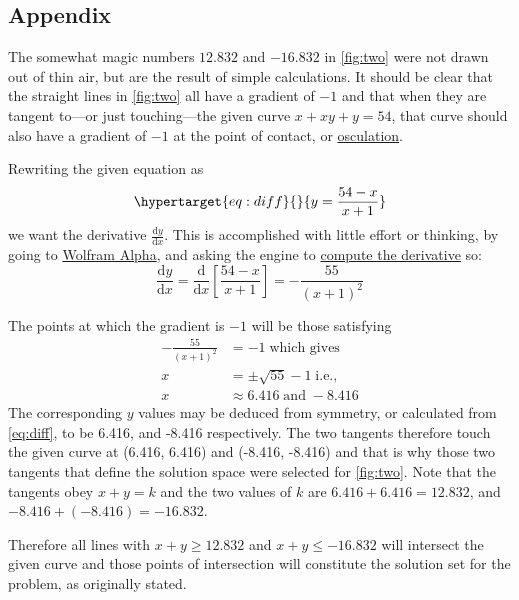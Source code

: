 \documentclass[
  a4paper,
]{article}
\begin{document}
\hypertarget{appendix}{%
\subsection{Appendix}\label{appendix}}

The somewhat magic numbers \(12.832\) and \(-16.832\) in \cref{fig:two}
were not drawn out of thin air, but are the result of simple
calculations. It should be clear that the straight lines in
\cref{fig:two} all have a gradient of \(-1\) and that when they are
tangent to---or just touching---the given curve \(x + xy + y = 54\),
that curve should also have a gradient of \(-1\) at the point of
contact, or
\href{https://en.wikipedia.org/wiki/Osculating_curve}{osculation}.

Rewriting the given equation as
\begin{equation}\protect\hypertarget{eq:diff}{}{
y = \frac{54-x}{x+1}
}\label{eq:diff}\end{equation} we want the derivative
\(\frac{\mathrm{d}y}{\mathrm{d}x}\). This is accomplished with little
effort or thinking, by going to
\href{https://www.wolframalpha.com}{Wolfram Alpha}, and asking the
engine to
\href{https://www.wolframalpha.com/calculators/derivative-calculator/}{compute
the derivative} so: \[
\frac{\mathrm{d}y}{\mathrm{d}x} = \frac{\mathrm{d}}{\mathrm{d}x}\left[\frac{54 - x}{x + 1}\right] = -\frac{55}{(x + 1)^2}
\]

The points at which the gradient is \(-1\) will be those satisfying \[
\begin{aligned}
-\frac{55}{(x+1)^2} &= -1 \; \mbox{which gives}\\
x &= \pm\sqrt{55} - 1 \; \mbox{i.e.,}\\
x &\approx 6.416 \;\mbox{and}\; -8.416
\end{aligned}
\] The corresponding \(y\) values may be deduced from symmetry, or
calculated from \cref{eq:diff}, to be 6.416, and -8.416 respectively.
The two tangents therefore touch the given curve at (6.416, 6.416) and
(-8.416, -8.416) and that is why those two tangents that define the
solution space were selected for \cref{fig:two}. Note that the tangents
obey \(x + y = k\) and the two values of \(k\) are
\(6.416 + 6.416 = 12.832\), and \(-8.416 + (-8.416) = -16.832\).

Therefore all lines with \(x + y \geq 12.832\) and
\(x + y \leq -16.832\) will intersect the given curve and those points
of intersection will constitute the solution set for the problem, as
originally stated.
\end{document}
